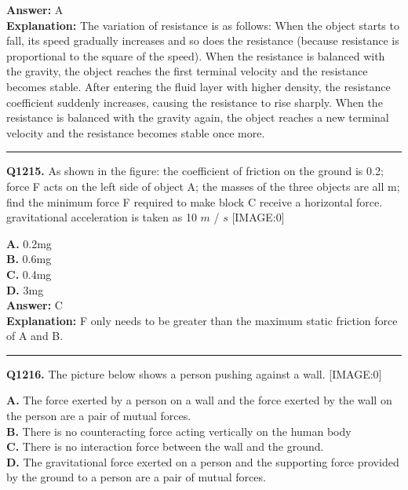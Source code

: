 \documentclass[12pt]{article}
\begin{document}
\textbf{Answer:} A \\
\textbf{Explanation:} The variation of resistance is as follows:
When the object starts to fall, its speed gradually increases and so does the resistance (because resistance is proportional to the square of the speed).
When the resistance is balanced with the gravity, the object reaches the first terminal velocity and the resistance becomes stable.
After entering the fluid layer with higher density, the resistance coefficient suddenly increases, causing the resistance to rise sharply.
When the resistance is balanced with the gravity again, the object reaches a new terminal velocity and the resistance becomes stable once more.

\hrule
\vspace{1em}


\noindent
\textbf{Q1215.} As shown in the figure: the coefficient of friction on the ground is 0.2; force F acts on the left side of object A; the masses of the three objects are all m; find the minimum force F required to make block C receive a horizontal force. gravitational acceleration is taken as 10
$𝑚$
/
$𝑠$
[IMAGE:0]



\textbf{A.} 0.2mg \\
\textbf{B.} 0.6mg \\
\textbf{C.} 0.4mg \\
\textbf{D.} 3mg \\

\textbf{Answer:} C \\
\textbf{Explanation:} F only needs to be greater than the maximum static friction force of A and B.

\hrule
\vspace{1em}


\noindent
\textbf{Q1216.} The picture below shows a person pushing against a wall.
[IMAGE:0]



\textbf{A.} The force exerted by a person on a wall and the force exerted by the wall on the person are a pair of mutual forces. \\
\textbf{B.} There is no counteracting force acting vertically on the human body \\
\textbf{C.} There is no interaction force between the wall and the ground. \\
\textbf{D.} The gravitational force exerted on a person and the supporting force provided by the ground to a person are a pair of mutual forces. \\
\end{document}
